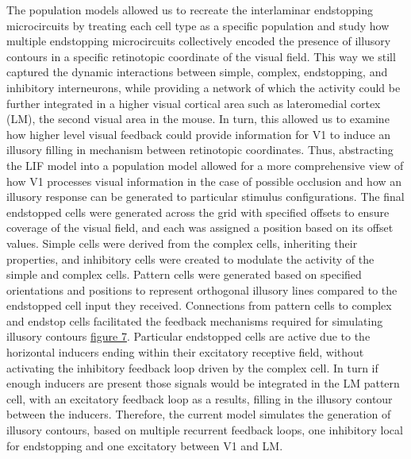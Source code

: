 \documentclass[12pt]{article}
\begin{document}
The population models allowed us to recreate the interlaminar endstopping microcircuits by treating each cell type as a specific population and study how multiple endstopping microcircuits collectively encoded the presence of illusory contours in a specific retinotopic coordinate of the visual field. This way we still captured the dynamic interactions between simple, complex, endstopping, and inhibitory interneurons, while providing a network of which the activity could be further integrated in a higher visual cortical area such as lateromedial cortex (LM), the second visual area in the mouse. In turn, this allowed us to examine how higher level visual feedback could provide information for V1 to induce an illusory filling in mechanism between retinotopic coordinates. Thus, abstracting the LIF model into a population model allowed for a more comprehensive view of how V1 processes visual information in the case of possible occlusion and how an illusory response can be generated to particular stimulus configurations. The final endstopped cells were generated across the grid with specified offsets to ensure coverage of the visual field, and each was assigned a position based on its offset values. Simple cells were derived from the complex cells, inheriting their properties, and inhibitory cells were created to modulate the activity of the simple and complex cells. Pattern cells were generated based on specified orientations and positions to represent orthogonal illusory lines compared to the endstopped cell input they received. Connections from pattern cells to complex and endstop cells facilitated the feedback mechanisms required for simulating illusory contours \hyperref[fig:illusory_filling]{figure 7}. Particular endstopped cells are active due to the horizontal inducers ending within their excitatory receptive field, without activating the inhibitory feedback loop driven by the complex cell. In turn if enough inducers are present those signals would be integrated in the LM pattern cell, with an excitatory feedback loop as a results, filling in the illusory contour between the inducers. Therefore, the current model simulates the generation of illusory contours, based on multiple recurrent feedback loops, one inhibitory local for endstopping and one excitatory between V1 and LM. 
\end{document}
